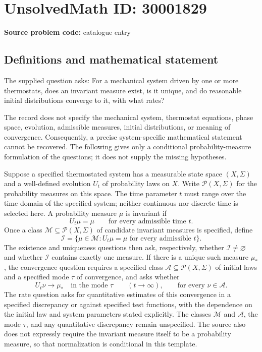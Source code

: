 \documentclass[11pt]{article}
\begin{document}
\section*{UnsolvedMath ID: 30001829}
\textbf{Source problem code:} catalogue entry
\subsection{Definitions and mathematical statement}
The supplied question asks: For a mechanical system driven by one or more thermostats, does an invariant measure exist, is it unique, and do reasonable initial distributions converge to it, with what rates?

The record does not specify the mechanical system, thermostat equations, phase space, evolution, admissible measures, initial distributions, or meaning of convergence. Consequently, a precise system-specific mathematical statement cannot be recovered. The following gives only a conditional probability-measure formulation of the questions; it does not supply the missing hypotheses.

Suppose a specified thermostated system has a measurable state space \((X,\Sigma)\) and a well-defined evolution \(U_t\) of probability laws on \(X\). Write \(\mathcal P(X,\Sigma)\) for the probability measures on this space. The time parameter \(t\) must range over the time domain of the specified system; neither continuous nor discrete time is selected here. A probability measure \(\mu\) is invariant if
\[
U_t\mu=\mu\qquad\text{for every admissible time }t.
\]
Once a class \(\mathcal M\subseteq\mathcal P(X,\Sigma)\) of candidate invariant measures is specified, define
\[
\mathcal I=\{\mu\in\mathcal M: U_t\mu=\mu\text{ for every admissible }t\}.
\]
The existence and uniqueness questions then ask, respectively, whether \(\mathcal I\neq\varnothing\) and whether \(\mathcal I\) contains exactly one measure. If there is a unique such measure \(\mu_*\), the convergence question requires a specified class \(\mathcal A\subseteq\mathcal P(X,\Sigma)\) of initial laws and a specified mode \(\tau\) of convergence, and asks whether
\[
U_t\nu\longrightarrow\mu_*\quad\text{in the mode }\tau
\qquad(t\to\infty),\qquad\text{for every }\nu\in\mathcal A.
\]
The rate question asks for quantitative estimates of this convergence in a specified discrepancy or against specified test functions, with the dependence on the initial law and system parameters stated explicitly. The classes \(\mathcal M\) and \(\mathcal A\), the mode \(\tau\), and any quantitative discrepancy remain unspecified. The source also does not expressly require the invariant measure itself to be a probability measure, so that normalization is conditional in this template.
\end{document}
